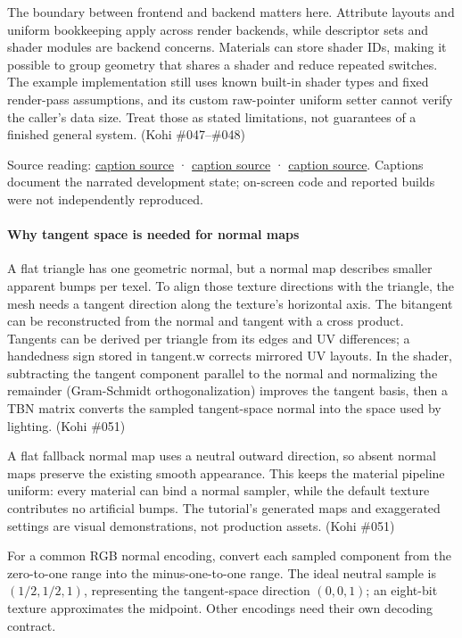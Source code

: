 The boundary between frontend and backend matters here. Attribute layouts and uniform bookkeeping apply across render backends, while descriptor sets and shader modules are backend concerns. Materials can store shader IDs, making it possible to group geometry that shares a shader and reduce repeated switches. The example implementation still uses known built-in shader types and fixed render-pass assumptions, and its custom raw-pointer uniform setter cannot verify the caller's data size. Treat those as stated limitations, not guarantees of a finished general system. (Kohi \#047--\#048)

Source reading: \href{https://www.youtube.com/watch?v=T8-Tv4UsKCk}{caption source} · \href{https://www.youtube.com/watch?v=4E0v_5Wva-8}{caption source} · \href{https://www.youtube.com/watch?v=9nP3aBsrCXs}{caption source}. Captions document the narrated development state; on-screen code and reported builds were not independently reproduced.

\paragraph{Why tangent space is needed for normal maps}\label{why-tangent-space-is-needed-for-normal-maps}

A flat triangle has one geometric normal, but a normal map describes smaller apparent bumps per texel. To align those texture directions with the triangle, the mesh needs a tangent direction along the texture's horizontal axis. The bitangent can be reconstructed from the normal and tangent with a cross product. Tangents can be derived per triangle from its edges and UV differences; a handedness sign stored in tangent.w corrects mirrored UV layouts. In the shader, subtracting the tangent component parallel to the normal and normalizing the remainder (Gram-Schmidt orthogonalization) improves the tangent basis, then a TBN matrix converts the sampled tangent-space normal into the space used by lighting. (Kohi \#051)

A flat fallback normal map uses a neutral outward direction, so absent normal maps preserve the existing smooth appearance. This keeps the material pipeline uniform: every material can bind a normal sampler, while the default texture contributes no artificial bumps. The tutorial's generated maps and exaggerated settings are visual demonstrations, not production assets. (Kohi \#051)

For a common RGB normal encoding, convert each sampled component from the zero-to-one range into the minus-one-to-one range. The ideal neutral sample is \((1/2,1/2,1)\), representing the tangent-space direction \((0,0,1)\); an eight-bit texture approximates the midpoint. Other encodings need their own decoding contract.

